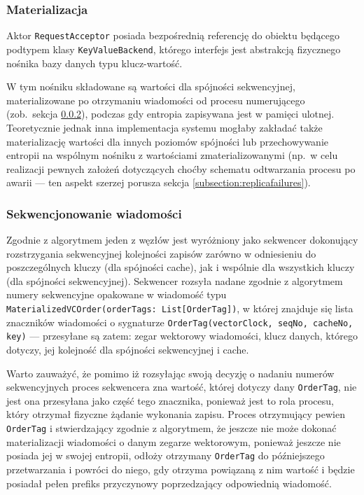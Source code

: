 \subsubsection{Materializacja}

Aktor \texttt{RequestAcceptor} posiada bezpośrednią referencję do obiektu będącego podtypem klasy \texttt{KeyValueBackend}, którego interfejs jest abstrakcją fizycznego nośnika bazy danych typu klucz-wartość.

W tym nośniku składowane są wartości dla spójności sekwencyjnej, materializowane po otrzymaniu
wiadomości od procesu numerującego (zob.\ sekcja \ref{subsubsection:sequencingimpl}), podczas gdy
entropia zapisywana jest w pamięci ulotnej. Teoretycznie jednak inna implementacja systemu mogłaby
zakładać także materializację wartości dla innych poziomów spójności lub przechowywanie entropii na
wspólnym nośniku z wartościami zmaterializowanymi (np.\ w celu realizacji pewnych założeń dotyczących choćby schematu odtwarzania procesu po awarii --- ten aspekt szerzej porusza sekcja \ref{subsection:replicafailures}).

\subsubsection{Sekwencjonowanie wiadomości} \label{subsubsection:sequencingimpl}

Zgodnie z algorytmem jeden z węzłów jest wyróżniony jako sekwencer dokonujący rozstrzygania sekwencyjnej kolejności zapisów zarówno w odniesieniu do poszczególnych kluczy (dla spójności cache), jak i wspólnie dla wszystkich kluczy (dla spójności sekwencyjnej). Sekwencer rozsyła nadane zgodnie z algorytmem numery sekwencyjne opakowane w wiadomość typu \texttt{MaterializedVCOrder(orderTags: List[OrderTag])}, w której znajduje się lista znaczników wiadomości o sygnaturze \texttt{OrderTag(vectorClock, seqNo, cacheNo, key)} --- przesyłane są zatem: zegar wektorowy wiadomości, klucz danych, którego dotyczy, jej kolejność dla spójności sekwencyjnej i cache.

Warto zauważyć, że pomimo iż rozsyłając swoją decyzję o nadaniu numerów sekwencyjnych proces sekwencera zna wartość, której dotyczy dany \texttt{OrderTag}, nie jest ona przesyłana jako część tego znacznika, ponieważ jest to rola procesu, który otrzymał fizyczne żądanie wykonania zapisu. Proces otrzymujący pewien \texttt{OrderTag} i stwierdzający zgodnie z algorytmem, że jeszcze nie może dokonać materializacji wiadomości o danym zegarze wektorowym, ponieważ jeszcze nie posiada jej w swojej entropii, odłoży otrzymany \texttt{OrderTag} do późniejszego przetwarzania i powróci do niego, gdy otrzyma powiązaną z nim wartość i będzie posiadał pełen prefiks przyczynowy poprzedzający odpowiednią wiadomość.

